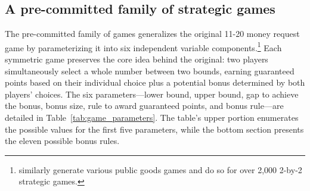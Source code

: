 \subsection{A pre-committed family of strategic games}

The pre-committed family of games generalizes the original 11-20 money request game by parameterizing it into six independent variable components.\footnote{\cite{alsobay2025integrative} similarly generate various public goods games and \cite{zhu2025capturing} do so for over 2,000 2-by-2 strategic games.}
Each symmetric game preserves the core idea behind the original: two players simultaneously select a whole number between two bounds, earning guaranteed points based on their individual choice plus a potential bonus determined by both players' choices.
The six parameters---lower bound, upper bound, gap to achieve the bonus, bonus size, rule to award guaranteed points, and bonus rule---are detailed in Table~\ref{tab:game_parameters}.
The table's upper portion enumerates the possible values for the first five parameters, while the bottom section presents the eleven possible bonus rules. 

